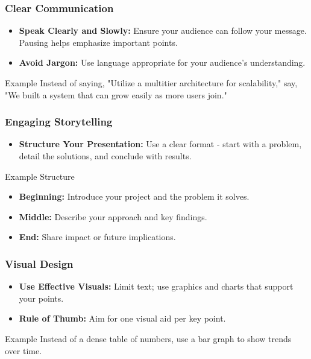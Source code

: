 \documentclass[aspectratio=169]{beamer}
\begin{document}
\begin{frame}[fragile]
    \frametitle{Clear Communication}
    \begin{itemize}
        \item \textbf{Speak Clearly and Slowly:} Ensure your audience can follow your message. Pausing helps emphasize important points.
        \item \textbf{Avoid Jargon:} Use language appropriate for your audience's understanding.
    \end{itemize}

    \begin{block}{Example}
        Instead of saying, "Utilize a multitier architecture for scalability," say, "We built a system that can grow easily as more users join."
    \end{block}
\end{frame}

\begin{frame}[fragile]
    \frametitle{Engaging Storytelling}
    \begin{itemize}
        \item \textbf{Structure Your Presentation:} Use a clear format - start with a problem, detail the solutions, and conclude with results.
    \end{itemize}

    \begin{block}{Example Structure}
        \begin{itemize}
            \item \textbf{Beginning:} Introduce your project and the problem it solves.
            \item \textbf{Middle:} Describe your approach and key findings.
            \item \textbf{End:} Share impact or future implications.
        \end{itemize}
    \end{block}
\end{frame}

\begin{frame}[fragile]
    \frametitle{Visual Design}
    \begin{itemize}
        \item \textbf{Use Effective Visuals:} Limit text; use graphics and charts that support your points. 
        \item \textbf{Rule of Thumb:} Aim for one visual aid per key point.
    \end{itemize}

    \begin{block}{Example}
        Instead of a dense table of numbers, use a bar graph to show trends over time.
    \end{block}
\end{frame}
\end{document}
